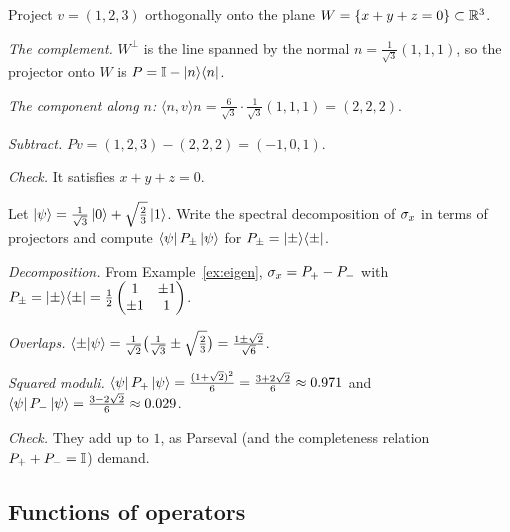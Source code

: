\begin{example}\label{ex:proj-plane}
  Project $v=(1,2,3)$ orthogonally onto the plane $W=\{x+y+z=0\}\subset\mathbb{R}^3$.
\end{example}
\begin{solution}
  \begin{steps}
    \item \emph{The complement.} $W^\perp$ is the line spanned by the normal $n=\tfrac1{\sqrt3}(1,1,1)$, so the projector onto $W$ is $P=\mathbb{I}-\left|n\right\rangle\!\left\langle n\right|$.
    \item \emph{The component along $n$:} $\langle n,v\rangle n=\tfrac6{\sqrt3}\cdot\tfrac1{\sqrt3}(1,1,1)=(2,2,2)$.
    \item \emph{Subtract.} $Pv=(1,2,3)-(2,2,2)=(-1,0,1)$.
    \item \emph{Check.} It satisfies $x+y+z=0$.
  \end{steps}
\end{solution}

\begin{example}\label{ex:measure-preview}
  Let $\left|\psi\right\rangle=\frac1{\sqrt3}\left|0\right\rangle+\sqrt{\tfrac23}\left|1\right\rangle$. Write the spectral decomposition of $\sigma_x$ in terms of projectors and compute $\left\langle\psi\right| P_\pm\left|\psi\right\rangle$ for $P_\pm=\left|\pm\right\rangle\!\left\langle\pm\right|$.
\end{example}
\begin{solution}
  \begin{steps}
    \item \emph{Decomposition.} From Example~\ref{ex:eigen}, $\sigma_x=P_+-P_-$ with $P_\pm=\left|\pm\right\rangle\!\left\langle\pm\right|=\tfrac12\begin{pmatrix}1&\pm1\\\pm1&1\end{pmatrix}$.
    \item \emph{Overlaps.} $\left\langle\pm\middle|\psi\right\rangle=\tfrac1{\sqrt2}\bigl(\tfrac1{\sqrt3}\pm\sqrt{\tfrac23}\bigr)=\tfrac{1\pm\sqrt2}{\sqrt6}$.
    \item \emph{Squared moduli.} $\left\langle\psi\right| P_+\left|\psi\right\rangle=\frac{(1+\sqrt2)^2}{6}=\frac{3+2\sqrt2}{6}\approx0.971$ and $\left\langle\psi\right| P_-\left|\psi\right\rangle=\frac{3-2\sqrt2}{6}\approx0.029$.
    \item \emph{Check.} They add up to $1$, as Parseval (and the completeness relation $P_++P_-=\mathbb{I}$) demand.
  \end{steps}
\end{solution}

\subsection{Functions of operators}

